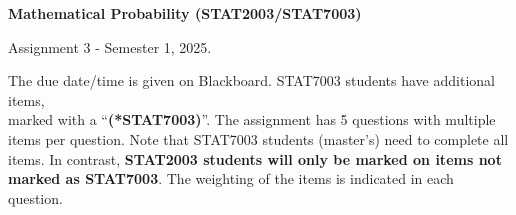 \documentclass[12pt]{article}
\begin{document}
\begin{center}

{\Large  {\bf Mathematical Probability (STAT2003/STAT7003)}

Assignment 3 - Semester 1, 2025.

}
\end{center}

The due date/time is given on Blackboard. STAT7003 students have additional items,\\ marked with a ``{\bf (*STAT7003)}''. The assignment has 5 questions with multiple items per question. Note that STAT7003 students (master's) need to complete all items. In contrast, {\bf STAT2003 students will only be marked on items not marked as STAT7003}. The weighting of the items is indicated in each question.\\ 
\end{document}
